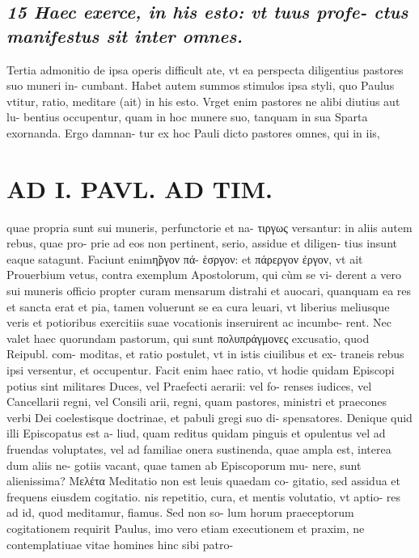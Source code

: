 \documentclass{article}
\begin{document}
\begin{pages}
\subsection*{\textit{15 Haec exerce, in his esto: vt tuus profe- ctus manifestus sit inter omnes. }}\pstart Tertia admonitio de ipsa operis difficult ate, vt ea perspecta diligentius pastores suo muneri in- cumbant. Habet autem summos stimulos ipsa styli, quo Paulus vtitur, ratio, meditare (ait) in his esto. Vrget enim pastores ne alibi diutius aut lu- bentius occupentur, quam in hoc munere suo, tanquam in sua Sparta exornanda. Ergo damnan- tur ex hoc Pauli dicto pastores omnes, qui in iis,  \pend
\section*{AD I. PAVL. AD TIM. }
\marginpar{[ p.430 ]}\pstart quae propria sunt sui muneris, perfunctorie et na- τιργως versantur: in aliis autem rebus, quae pro- prie ad eos non pertinent, serio, assidue et diligen- tius insunt eaque satagunt. Faciunt enimη̃ργον πά- ἑσργον: et πάρεργον ἐργον, vt ait Prouerbium vetus, contra exemplum Apostolorum, qui cùm se vi- derent a vero sui muneris officio propter curam mensarum distrahi et auocari, quanquam ea res et sancta erat et pia, tamen voluerunt se ea cura leuari, vt liberius meliusque veris et potioribus exercitiis suae vocationis inseruirent ac incumbe- rent. Nec valet haec quorundam pastorum, qui sunt πολυπράγμονες excusatio, quod Reipubl. com- moditas, et ratio postulet, vt in istis ciuilibus et ex- traneis rebus ipsi versentur, et occupentur. Facit enim haec ratio, vt hodie quidam Episcopi potius sint militares Duces, vel Praefecti aerarii: vel fo- renses iudices, vel Cancellarii regni, vel Consili arii, regni, quam pastores, ministri et praecones verbi Dei coelestisque doctrinae, et pabuli gregi suo di- spensatores. Denique quid illi Episcopatus est a- liud, quam reditus quidam pinguis et opulentus vel ad fruendas voluptates, vel ad familiae onera sustinenda, quae ampla est, interea dum aliis ne- gotiis vacant, quae tamen ab Episcoporum mu- nere, sunt alienissima?  \pend\pstart Μελέτα Meditatio non est leuis quaedam co- gitatio, sed assidua et frequens eiusdem cogitatio. nis repetitio, cura, et mentis volutatio, vt aptio- res ad id, quod meditamur, fiamus. Sed non so- lum horum praeceptorum cogitationem requirit Paulus, imo vero etiam executionem et praxim, ne contemplatiuae vitae homines hinc sibi patro-  \pend

\end{pages}
\end{document}
